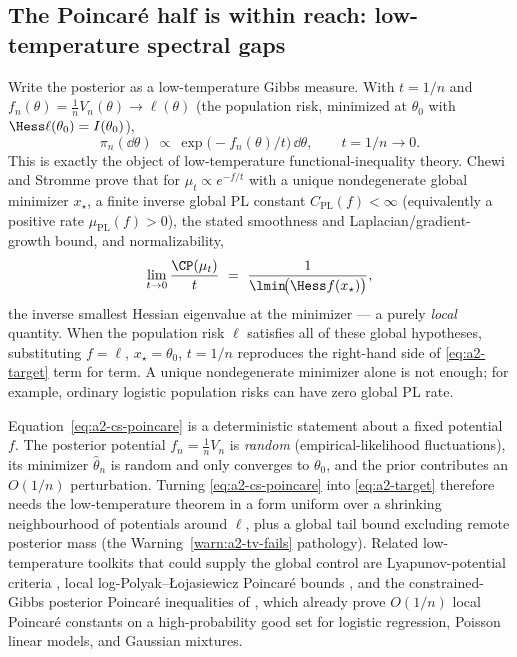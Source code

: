 \documentclass[../../main.tex]{subfiles}
\begin{document}
\subsection{The Poincar\'e half is within reach: low-temperature spectral gaps}
\label{subsec:a2-poincare}

Write the posterior as a low-temperature Gibbs measure. With $t=1/n$ and
$f_n(\theta)=\tfrac1n V_n(\theta)\to\ell(\theta)$ (the population risk, minimized at $\theta_0$
with $\Hess\ell(\theta_0)=I(\theta_0)$),
\[
  \pi_n(\dd\theta)\ \propto\ \exp\!\big(-f_n(\theta)/t\big)\,\dd\theta,
  \qquad t=1/n\to0 .
\]
This is exactly the object of low-temperature functional-inequality theory. Chewi and Stromme
\cite{ChewiStromme2024Ballistic} prove that for $\mu_t\propto e^{-f/t}$ with a unique
nondegenerate global minimizer $x_\star$, a finite inverse global PL constant
$C_{\mathrm{PL}}(f)<\infty$ (equivalently a positive rate $\mu_{\mathrm{PL}}(f)>0$), the stated
smoothness and Laplacian/gradient-growth bound, and normalizability,
\begin{equation}\label{eq:a2-cs-poincare}
  \lim_{t\to0}\frac{\CP(\mu_t)}{t}\ =\ \frac{1}{\lmin\!\big(\Hess f(x_\star)\big)} ,
\end{equation}
the inverse smallest Hessian eigenvalue at the minimizer --- a purely \emph{local} quantity.
When the population risk $\ell$ satisfies all of these global hypotheses, substituting
$f=\ell$, $x_\star=\theta_0$, $t=1/n$ reproduces the right-hand side of
\eqref{eq:a2-target} term for term. A unique nondegenerate minimizer alone is not enough; for
example, ordinary logistic population risks can have zero global PL rate.

\begin{remark}
\label{rem:a2-transfer}
Equation~\eqref{eq:a2-cs-poincare} is a deterministic statement about a fixed potential $f$.
The posterior potential $f_n=\tfrac1nV_n$ is \emph{random} (empirical-likelihood fluctuations),
its minimizer $\hat\theta_n$ is random and only converges to $\theta_0$, and the prior
contributes an $O(1/n)$ perturbation. Turning \eqref{eq:a2-cs-poincare} into
\eqref{eq:a2-target} therefore needs the low-temperature theorem in a form uniform over a
shrinking neighbourhood of potentials around $\ell$, plus a global tail bound excluding remote
posterior mass (the Warning~\ref{warn:a2-tv-fails} pathology). Related low-temperature toolkits
that could supply the global control are Lyapunov-potential criteria
\cite{ChenSridharan2024Lyapunov}, local log-Polyak--{\L}ojasiewicz Poincar\'e bounds
\cite{GongHeShen2025LogPL}, and the constrained-Gibbs posterior Poincar\'e inequalities of
\cite{ConstrainedGibbs2026}, which already prove $O(1/n)$ local Poincar\'e constants on a
high-probability good set for logistic regression, Poisson linear models, and Gaussian mixtures.
\end{remark}
\end{document}
